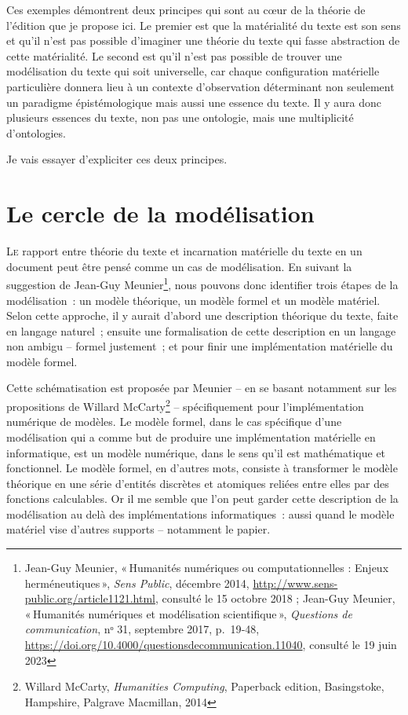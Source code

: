 Ces exemples démontrent deux principes qui sont au c\oe ur de la théorie
de l'édition que je propose ici. Le premier est que la matérialité du
texte est son sens et qu'il n'est pas possible d'imaginer une théorie du
texte qui fasse abstraction de cette matérialité. Le second est qu'il
n'est pas possible de trouver une modélisation du texte qui soit
universelle, car chaque configuration matérielle particulière donnera
lieu à un contexte d'observation déterminant non seulement un paradigme
épistémologique mais aussi une essence du texte. Il y aura donc
plusieurs essences du texte, non pas une ontologie, mais une
multiplicité d'ontologies.

Je vais essayer d'expliciter ces deux principes.

\hypertarget{le-cercle-de-la-moduxe9lisation}{%
\chapter{Le cercle de la
modélisation}\label{le-cercle-de-la-moduxe9lisation}}

\lettrine{L}e rapport entre théorie du texte et incarnation matérielle
du texte en un document peut être pensé comme un cas de modélisation. En
suivant la suggestion de Jean-Guy Meunier\footnote{Jean-Guy Meunier,
  {«\,Humanités numériques ou computationnelles : {Enjeux}
  herméneutiques\,»}, \emph{Sens Public}, décembre 2014,
  \url{http://www.sens-public.org/article1121.html}, consulté le 15
  octobre 2018 ; Jean-Guy Meunier, {«\,Humanités numériques et
  modélisation scientifique\,»}, \emph{Questions de communication}, nᵒ
  31, septembre 2017, p.~19‑48,
  \url{https://doi.org/10.4000/questionsdecommunication.11040}, consulté
  le 19 juin 2023}, nous pouvons donc identifier trois étapes de la
modélisation~: un modèle théorique, un modèle formel et un modèle
matériel. Selon cette approche, il y aurait d'abord une description
théorique du texte, faite en langage naturel~; ensuite une formalisation
de cette description en un langage non ambigu -- formel justement~; et
pour finir une implémentation matérielle du modèle formel.

Cette schématisation est proposée par Meunier -- en se basant notamment
sur les propositions de Willard McCarty\footnote{Willard McCarty,
  \emph{Humanities {Computing}}, Paperback edition, Basingstoke,
  Hampshire, Palgrave Macmillan, 2014} -- spécifiquement pour
l'implémentation numérique de modèles. Le modèle formel, dans le cas
spécifique d'une modélisation qui a comme but de produire une
implémentation matérielle en informatique, est un modèle numérique, dans
le sens qu'il est mathématique et fonctionnel. Le modèle formel, en
d'autres mots, consiste à transformer le modèle théorique en une série
d'entités discrètes et atomiques reliées entre elles par des fonctions
calculables. Or il me semble que l'on peut garder cette description de
la modélisation au delà des implémentations informatiques~: aussi quand
le modèle matériel vise d'autres supports -- notamment le papier.


